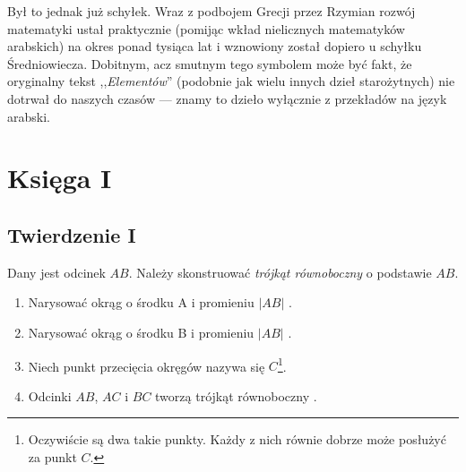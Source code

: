 \documentclass[12pt, a4paper]{article}
\begin{document}
Był to jednak już schyłek. Wraz z podbojem Grecji przez Rzymian rozwój
matematyki ustał praktycznie (pomijąc wkład nielicznych matematyków arabskich)
na okres ponad tysiąca lat i wznowiony został dopiero u schyłku Średniowiecza.
Dobitnym, acz smutnym tego symbolem może być fakt, że oryginalny tekst
,,\emph{Elementów}'' (podobnie jak wielu innych dzieł starożytnych) nie dotrwał
do naszych czasów --- znamy to dzieło wyłącznie z przekładów na język arabski.

\pagebreak

\section*{Księga I}
\subsection*{Twierdzenie I}

Dany jest odcinek $AB$. Należy skonstruować \emph{trójkąt równoboczny} o
podstawie $AB$.

\begin{figure}[h!]
    \begin{center}
    \end{center}
\end{figure}

\begin{enumerate}
    \item Narysować okrąg o środku A i promieniu $|AB|$ .
    \item Narysować okrąg o środku B i promieniu $|AB|$ .
    \item Niech punkt przecięcia okręgów nazywa się $C$\footnote{
        Oczywiście są dwa takie punkty. Każdy z nich równie dobrze może posłużyć
        za punkt $C$.
    }.
    \item Odcinki $AB$, $AC$ i $BC$ tworzą trójkąt równoboczny .
\end{enumerate}

\end{document}
